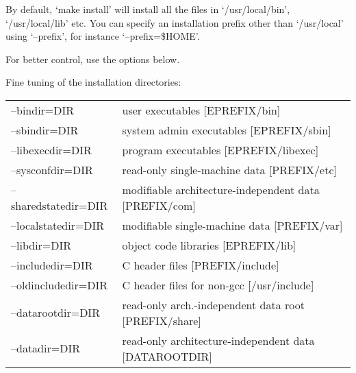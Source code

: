 \begin{maxipage}
\begin{example}
By default, `make install' will install all the files in
`/usr/local/bin', `/usr/local/lib' etc.  You can specify
an installation prefix other than `/usr/local' using `--prefix',
for instance `--prefix=\$HOME'.

For better control, use the options below.\\ \vspace{.4cm}

Fine tuning of the installation directories:\\ \vspace{.4cm}
\begin{tabular}{ll}
--bindir=DIR         &     user executables [EPREFIX/bin]\\
--sbindir=DIR       &      system admin executables [EPREFIX/sbin]\\
--libexecdir=DIR    &      program executables [EPREFIX/libexec]\\
--sysconfdir=DIR      &    read-only single-machine data [PREFIX/etc]\\
--sharedstatedir=DIR    &  modifiable architecture-independent data [PREFIX/com]\\
--localstatedir=DIR    &   modifiable single-machine data [PREFIX/var]\\
--libdir=DIR     &         object code libraries [EPREFIX/lib]\\
--includedir=DIR     &     C header files [PREFIX/include]\\
--oldincludedir=DIR  &     C header files for non-gcc [/usr/include]\\
--datarootdir=DIR    &     read-only arch.-independent data root [PREFIX/share]\\
--datadir=DIR       &      read-only architecture-independent data [DATAROOTDIR]\\
\end{tabular}

\end{example}
\end{maxipage}

